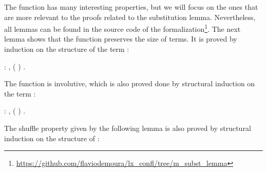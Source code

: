 The  function has many interesting properties, but we will focus on the ones that are more relevant to the proofs related to the substitution lemma. Nevertheless, all lemmas can be found in the source code of the formalization\footnote{\url{https://github.com/flaviodemoura/lx_confl/tree/m_subst_lemma}}. The next lemma shows that the  function preserves the size of terms. It is proved by induction on the structure of the term : 
\begin{coqdoccode}
\coqdocemptyline
\coqdocnoindent
{}  : \coqdockw{\ensuremath{\forall}}   ,  (   )   .\coqdoceol
\coqdocemptyline
\coqdocemptyline
\end{coqdoccode}
The  function is involutive, which is also proved done by structural induction on the term : 
\begin{coqdoccode}
\coqdocemptyline
\coqdocnoindent
{}  : \coqdockw{\ensuremath{\forall}}   ,    (   )  .\coqdoceol
\coqdocemptyline
\end{coqdoccode}
The shuffle property given by the following lemma is also proved by structural induction on the structure of :
